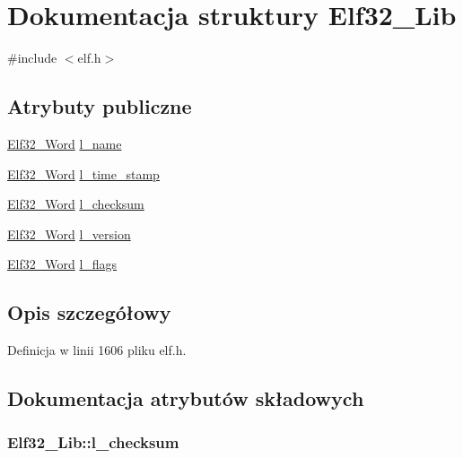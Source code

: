 \hypertarget{struct_elf32___lib}{\section{Dokumentacja struktury Elf32\-\_\-\-Lib}
\label{struct_elf32___lib}
}


{\ttfamily \#include $<$elf.\-h$>$}

\subsection*{Atrybuty publiczne}
\begin{DoxyCompactItemize}
\item 
\hyperlink{elf_8h_af5924ece606c732e86f8263a19408e45}{Elf32\-\_\-\-Word} \hyperlink{struct_elf32___lib_af40827a2882aaf96d42ae60dac6551ee}{l\-\_\-name}
\item 
\hyperlink{elf_8h_af5924ece606c732e86f8263a19408e45}{Elf32\-\_\-\-Word} \hyperlink{struct_elf32___lib_ae7119079569dcf7ecebccc47cb6350be}{l\-\_\-time\-\_\-stamp}
\item 
\hyperlink{elf_8h_af5924ece606c732e86f8263a19408e45}{Elf32\-\_\-\-Word} \hyperlink{struct_elf32___lib_a290248b0a3cecff9d43f796dd5c50b12}{l\-\_\-checksum}
\item 
\hyperlink{elf_8h_af5924ece606c732e86f8263a19408e45}{Elf32\-\_\-\-Word} \hyperlink{struct_elf32___lib_ab1be8296800ef7b233adb56f1cfb901c}{l\-\_\-version}
\item 
\hyperlink{elf_8h_af5924ece606c732e86f8263a19408e45}{Elf32\-\_\-\-Word} \hyperlink{struct_elf32___lib_a4a0feb8162591596d3653f561ee8759e}{l\-\_\-flags}
\end{DoxyCompactItemize}


\subsection{Opis szczegółowy}


Definicja w linii 1606 pliku elf.\-h.



\subsection{Dokumentacja atrybutów składowych}
\hypertarget{struct_elf32___lib_a290248b0a3cecff9d43f796dd5c50b12}{
\subsubsection[{l\-\_\-checksum}]{ Elf32\-\_\-\-Lib\-::l\-\_\-checksum}}\label{struct_elf32___lib_a290248b0a3cecff9d43f796dd5c50b12}


